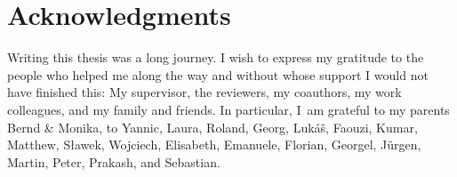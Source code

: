 \documentclass[../../diss.tex]{subfiles}
\begin{document}
\begingroup%
\let\clearpage\relax%
\let\cleardoublepage\relax%
\chapter*{Acknowledgments}%
\endgroup%

Writing this thesis was a long journey.
I wish to express my gratitude to the people who helped me along the way and without whose support I would not have finished this: My supervisor, the reviewers, my coauthors, my work colleagues, and my family and friends.
In particular, I~am grateful to my parents Bernd \& Monika,
to Yannic,
Laura,
Roland,
Georg, Lukáš,
Faouzi, Kumar, Matthew, Sławek, Wojciech,
Elisabeth, Emanuele, Florian, Georgel, Jürgen, Martin, Peter, Prakash, and Sebastian.
\end{document}
